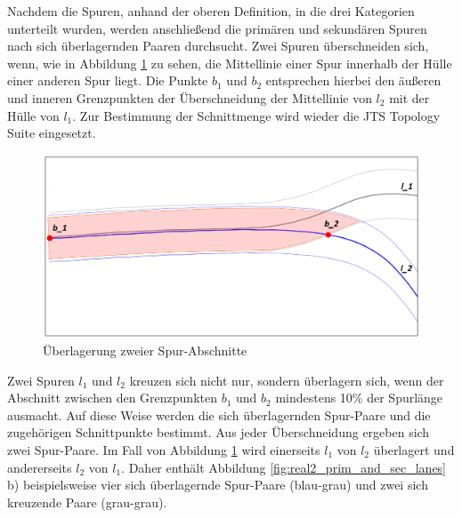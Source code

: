 Nachdem die Spuren, anhand der oberen Definition, in die drei Kategorien unterteilt wurden, werden
anschließend die primären und sekundären Spuren nach sich überlagernden Paaren durchsucht.
Zwei Spuren überschneiden sich, wenn, wie in
Abbildung \ref{fig:real2_lane_crossing} zu sehen, die Mittellinie einer Spur innerhalb der Hülle einer
anderen Spur liegt. Die Punkte $b_1$ und $b_2$ entsprechen hierbei den äußeren und inneren Grenzpunkten
der Überschneidung der Mittellinie von $l_2$ mit der Hülle von $l_1$. Zur Bestimmung der Schnittmenge
wird wieder die JTS Topology Suite eingesetzt.

\begin{figure}[H]
    \centering
    \includegraphics[width=0.5\linewidth]{../resources/img/umsetzung/U2/lane_crossing}
    \caption{Überlagerung zweier Spur-Abschnitte}
    \label{fig:real2_lane_crossing}
\end{figure}

Zwei Spuren $l_1$ und $l_2$ kreuzen sich nicht nur, sondern überlagern sich, wenn der Abschnitt zwischen
den Grenzpunkten $b_1$ und $b_2$ mindestens 10\% der Spurlänge ausmacht. Auf diese Weise werden die
sich überlagernden Spur-Paare und die zugehörigen Schnittpunkte bestimmt.
Aus jeder Überschneidung ergeben sich zwei Spur-Paare.
Im Fall von Abbildung \ref{fig:real2_lane_crossing} wird einerseits $l_1$ von $l_2$ überlagert und andererseits
$l_2$ von $l_1$.  
Daher enthält Abbildung \ref{fig:real2_prim_and_sec_lanes} b) beispielsweise vier sich überlagernde Spur-Paare
(blau-grau) und zwei sich kreuzende Paare (grau-grau).

